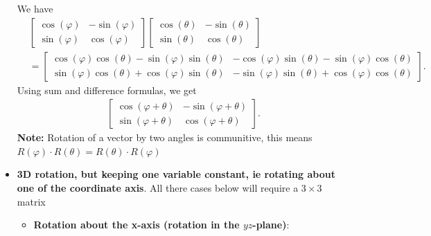 \documentclass{report}
\begin{document}
\begin{itemize}
            \bigbreak \noindent 
            We have
            \begin{align*}
                &\begin{bmatrix} \cos{\left(\varphi\right)} & -\sin{\left(\varphi\right)} \\ \sin{\left(\varphi\right)} & \cos{\left(\varphi\right)} \end{bmatrix} \begin{bmatrix} \cos{\left(\theta \right)} & -\sin{\left(\theta \right)} \\ \sin{\left(\theta \right)} & \cos{\left(\theta \right)}\end{bmatrix} \\
                &= \begin{bmatrix} \cos{\left(\varphi\right)}\cos{\left(\theta \right)} -\sin{\left(\varphi\right)}\sin{\left(\theta \right)} & -\cos{\left(\varphi \right)}\sin{\left(\theta \right)} -\sin{\left(\varphi\right)}\cos{\left(\theta \right)} \\ \sin{\left(\varphi\right)}\cos{\left(\theta \right)} + \cos{\left(\varphi\right)}\sin{\left(\theta \right)} & -\sin{\left(\varphi\right)}\sin{\left(\theta \right)}+\cos{\left(\varphi\right)}\cos{\left(\theta \right)}\end{bmatrix} 
            .\end{align*}
            Using sum and difference formulas, we get
            \begin{align*}
                \begin{bmatrix} \cos{\left(\varphi + \theta \right)}& -\sin{\left(\varphi + \theta \right)}\\ \sin{\left(\varphi + \theta \right)}  & \cos{\left(\varphi + \theta \right)}\end{bmatrix}
            .\end{align*}
            \bigbreak \noindent 
            \textbf{Note:} Rotation of a vector by two angles is communitive, this means $R(\varphi) \cdot R(\theta ) = R(\theta) \cdot R(\varphi) $ 
        \item \textbf{3D rotation, but keeping one variable constant, ie rotating about one of the coordinate axis}. 
            \bigbreak \noindent 
            All there cases below will require a $3\times 3$ matrix
            \begin{itemize}
                \item \textbf{Rotation about the x-axis (rotation in the $yz$-plane)}: 
                    \begin{align*}

\end{align*}
\end{itemize}
\end{itemize}
\end{document}
